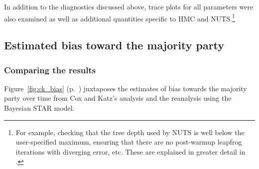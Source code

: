 %
%
%

In addition to the diagnostics discussed above, trace plots for all parameters were also 
examined as well as additional quantities specific to HMC and NUTS.\footnote{For example, 
checking that the tree depth used by NUTS is well below the user-specified maximum, ensuring 
that there are no post-warmup leapfrog iterations with diverging error, etc. These are explained 
in greater detail in .}


\subsection[Estimates]{Estimated bias toward the majority party}
\label{results}

\subsubsection{Comparing the results}

Figure~\ref{fig:ck_bias} (p.~\pageref{fig:ck_bias}) juxtaposes the estimates of 
bias towards the majority party over time from Cox and Katz's analysis and the reanalysis 
using the Bayesian STAR model.

